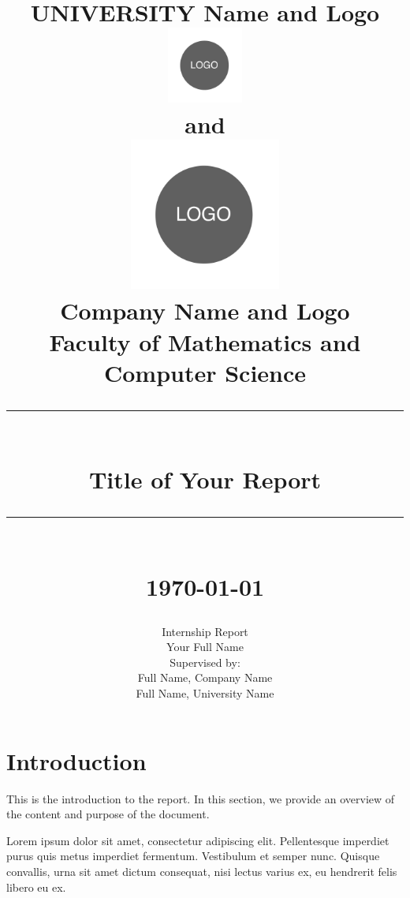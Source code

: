 \documentclass[a4paper, 12pt]{article}
\newcommand{\HRule}[1]{\rule{\linewidth}{#1}}
\begin{document}
\title{
    \normalsize  UNIVERSITY Name and Logo
    \\ [1.0cm]
    \includegraphics[width=25mm]{img/logo.png}  \\[.5cm]
    and   \\[.5cm]
    \includegraphics[width=50mm]{img/logo.png}\\[.5cm]
    \normalsize Company Name and Logo \\ [1.0cm]
    Faculty of Mathematics and Computer Science\\
    \HRule{2pt} \\
    \LARGE \textbf{Title of Your Report}
    \HRule{2pt} \\ [0.5cm]
    \normalsize \today
}

\author{
    Internship Report \\[0.5cm]
    Your Full Name  \\[1cm]
    Supervised by: \\
    Full Name,  Company  Name\\
    Full Name,  University Name
}


\maketitle

\newpage
\tableofcontents
\newpage

\section*{Introduction}
This is the introduction to the report. In this section, we provide an overview of the content and purpose of the document.

Lorem ipsum dolor sit amet, consectetur adipiscing elit. Pellentesque imperdiet purus quis metus imperdiet fermentum. Vestibulum et semper nunc. Quisque convallis, urna sit amet dictum consequat, nisi lectus varius ex, eu hendrerit felis libero eu ex.
\end{document}
